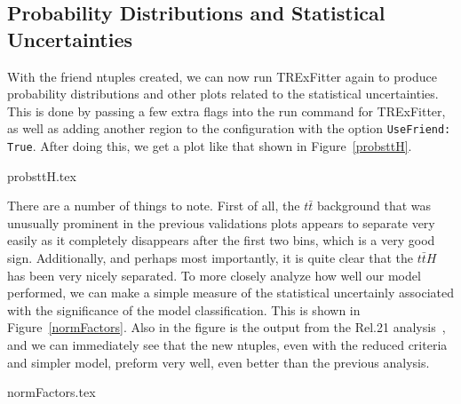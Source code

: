     \subsection{Probability Distributions and Statistical Uncertainties}
    With the friend ntuples created, we can now run TRExFitter again to produce probability distributions and other plots related to the statistical uncertainties. This is done by passing a few extra flags into the run command for TRExFitter, as well as adding another region to the configuration with the option \texttt{UseFriend: True}. After doing this, we get a plot like that shown in Figure~\ref{probsttH}.

    {probsttH.tex}

    There are a number of things to note. First of all, the $t\bar{t}$ background that was unusually prominent in the previous validations plots appears to separate very easily as it completely disappears after the first two bins, which is a very good sign. Additionally, and perhaps most importantly, it is quite clear that the $t\bar{t}H$ has been very nicely separated. To more closely analyze how well our model performed, we can make a simple measure of the statistical uncertainly associated with the significance of the model classification. This is shown in Figure~\ref{normFactors}. Also in the figure is the output from the Rel.21 analysis~\cite{Yazykov}, and we can immediately see that the new ntuples, even with the reduced criteria and simpler model, preform very well, even better than the previous analysis.

    {normFactors.tex}
